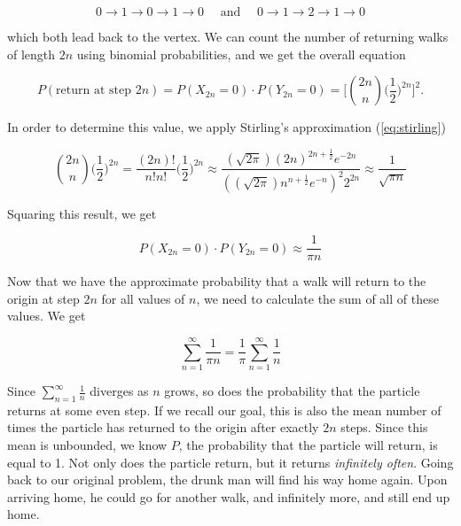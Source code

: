 \documentclass[11pt]{article}
\begin{document}
\begin{equation}
0 \to 1 \to 0 \to 1 \to 0 \quad \text{ and } \quad 0 \to 1 \to 2 \to 1 \to 0 
\end{equation}

which both lead back to the vertex. We can count the number of returning walks of length $2n$ using binomial probabilities, and we get the overall equation

\begin{equation}
P(\text{return at step } 2n) =  P(X_{2n} = 0) \cdot P(Y_{2n} = 0) = \bigg[{2n \choose n}\bigg(\frac{1}{2}\bigg)^{2n}\bigg]^{2}.
\end{equation}

In order to determine this value, we apply Stirling's approximation (\ref{eq:stirling})

\begin{equation}
{2n \choose n}\bigg(\frac{1}{2}\bigg)^{2n} = \frac{(2n)!}{n! n!} \bigg(\frac{1}{2}\bigg)^{2n} \approx \frac{(\sqrt{2\pi})(2n)^{2n + \frac{1}{2}}e^{-2n}}{((\sqrt{2\pi})n^{n + \frac{1}{2}}e^{-n})^{2}2^{2n}} \approx \frac{1}{\sqrt{\pi n}}
\end{equation}

Squaring this result, we get

 \begin{equation}
P(X_{2n} = 0) \cdot P(Y_{2n} = 0) \approx \frac{1}{\pi n}
\end{equation}

Now that we have the approximate probability that a walk will return to the origin at step $2n$ for all values of $n$, we need to calculate the sum of all of these values. We get

\begin{equation}
\sum_{n=1}^{\infty} \frac{1}{\pi n} = \frac{1}{\pi} \sum_{n=1}^{\infty} \frac{1}{n}
\end{equation}

Since $\sum_{n=1}^{\infty} \frac{1}{n}$ diverges as $n$ grows, so does the probability that the particle returns at some even step. If we recall our goal, this is also the mean number of times the particle has returned to the origin after exactly $2n$ steps. Since this mean is unbounded, we know $P$, the probability that the particle will return, is equal to 1. Not only does the particle return, but it returns \textit{infinitely often}. Going back to our original problem, the drunk man will find his way home again. Upon arriving home, he could go for another walk, and infinitely more, and still end up home.
\cite{50}
\end{document}
